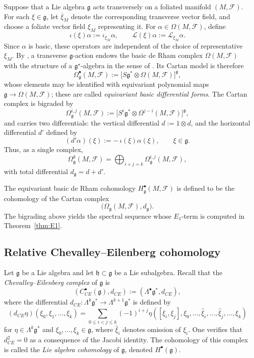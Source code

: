 \documentclass[reqno, 11pt]{amsart}
\theoremstyle{definition}
\theoremstyle{property}
\theoremstyle{remark}
\numberwithin{equation}{section}
\begin{document}
Suppose that a Lie algebra $\mathfrak g$ acts transversely on a foliated manifold
$(M,\mathcal F)$. For each $\xi\in\mathfrak g$, let $\overline{\xi}_M$ denote
the corresponding transverse vector field, and choose a foliate vector field
$\xi_M$ representing it. For $\alpha\in\Omega(M,\mathcal F)$, define
\[
\iota(\xi)\alpha:=\iota_{\xi_M}\alpha,\qquad
\mathcal L(\xi)\alpha:=\mathcal L_{\xi_M}\alpha.
\]
Since $\alpha$ is basic, these operators are independent of the choice of
representative $\xi_M$. By \cite[Proposition~3.12]{GT10}, a transverse
$\mathfrak g$-action endows the basic de Rham complex $\Omega(M,\mathcal F)$
with the structure of a $\mathfrak g^\star$-algebra in the sense of
\cite[Chapter~2]{GS99}. Its Cartan model is therefore
\[
\Omega^\bullet_{\mathfrak g}(M,\mathcal F):=
\bigl[S\mathfrak g^*\otimes\Omega(M,\mathcal F)\bigr]^{\mathfrak g},
\]
whose elements may be identified with equivariant polynomial maps
$\mathfrak g\to \Omega(M,\mathcal F)$; these are called
\emph{equivariant basic differential forms}.
The Cartan complex is bigraded by
\[
\Omega_{\mathfrak g}^{i,j}(M,\mathcal F):=
\bigl[S^i\mathfrak g^*\otimes\Omega^{j-i}(M,\mathcal F)\bigr]^{\mathfrak g},
\]
and carries two differentials: the vertical differential
$ d:=1\otimes d$, 
and the horizontal differential $d'$ defined by
\[
(d'\alpha)(\xi):=-\,\iota(\xi)\alpha(\xi),
\qquad \xi\in\mathfrak g.
\]
Thus, as a single complex,
\[
\Omega_{\mathfrak g}^k(M,\mathcal F)
=
\bigoplus_{i+j=k}\Omega_{\mathfrak g}^{i,j}(M,\mathcal F),
\]
with total differential $d_{\mathfrak g}=d+d'$.

The equivariant basic de Rham cohomology
$H^\bullet_{\mathfrak g}(M,\mathcal F)$ is defined to be the cohomology of the
Cartan complex
\[
\bigl(\Omega_{\mathfrak g}(M,\mathcal F),d_{\mathfrak g}\bigr).
\]
The bigrading above yields the spectral sequence whose $E_1$-term is computed in
Theorem~\ref{thm:E1}.\subsection{Relative Chevalley--Eilenberg cohomology}

Let $\mathfrak g$ be a Lie algebra and let $\mathfrak h\subset \mathfrak g$ be a
Lie subalgebra. Recall that the \emph{Chevalley--Eilenberg complex} of $\mathfrak g$ is
\[
(C_{CE}^\bullet(\mathfrak g),d_{CE}) := (\Lambda^\bullet \mathfrak g^*, d_{CE}),
\] where the differential
$d_{CE}: \Lambda^k\mathfrak{g}^* \to \Lambda^{k+1}\mathfrak{g}^*$
is defined by
\[
(d_{CE}\eta)(\xi_0, \xi_1, \ldots, \xi_k)
= \sum_{0 \leq i < j \leq k} (-1)^{i+j}
\eta([\xi_i, \xi_j], \xi_0, \ldots, \hat{\xi}_i,
\ldots, \hat{\xi}_j, \ldots, \xi_k)
\]
for $\eta \in \Lambda^k\mathfrak{g}^*$ and
$\xi_0, \ldots, \xi_k \in \mathfrak{g}$, where $\hat{\xi}_i$
denotes omission of $\xi_i$. One verifies that $d_{CE}^2 = 0$
as a consequence of the Jacobi identity. The cohomology of this
complex is called the \emph{Lie algebra cohomology} of
$\mathfrak{g}$, denoted $H^\bullet(\mathfrak{g})$.
\end{document}
